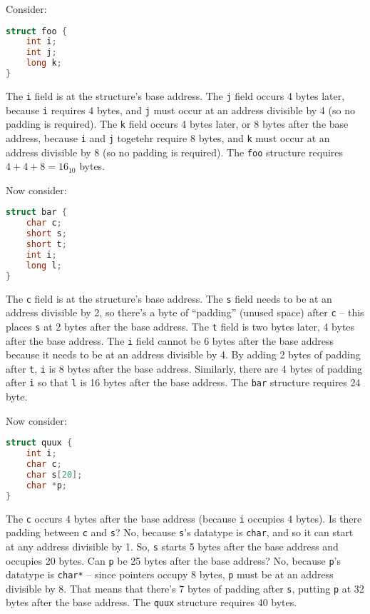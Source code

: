 \documentclass{article}
\begin{document}
Consider:

\begin{lstlisting}[language=C]
struct foo {
    int i;
    int j;
    long k;
}
\end{lstlisting}

The \lstinline{i} field is at the structure's base address.
The \lstinline{j} field occurs 4 bytes later, because \lstinline{i} requires 4 bytes, and \lstinline{j} must occur at an address divisible by 4 (so no padding is required).
The \lstinline{k} field occurs 4 bytes later, or 8 bytes after the base address, because \lstinline{i} and \lstinline{j} togetehr require 8 bytes, and \lstinline{k} must occur at an address divisible by 8 (so no padding is required).
The \lstinline{foo} structure requires $4+4+8=16_{10}$ bytes.

Now consider:

\begin{lstlisting}[language=C]
struct bar {
    char c;
    short s;
    short t;
    int i;
    long l;
}
\end{lstlisting}

The \lstinline{c} field is at the structure's base address.
The \lstinline{s} field needs to be at an address divisible by 2, so there's a byte of ``padding'' (unused space) after \lstinline{c} -- this places \lstinline{s} at 2 bytes after the base address.
The \lstinline{t} field is two bytes later, 4 bytes after the base address.
The \lstinline{i} field cannot be 6 bytes after the base address because it needs to be at an address divisible by 4.
By adding 2 bytes of padding after \lstinline{t}, \lstinline{i} is 8 bytes after the base address.
Similarly, there are 4 bytes of padding after \lstinline{i} so that \lstinline{l} is 16 bytes after the base address.
The \lstinline{bar} structure requires 24 byte.

Now consider:

\begin{lstlisting}[language=C]
struct quux {
    int i;
    char c;
    char s[20];
    char *p;
}
\end{lstlisting}

The \lstinline{c} occurs 4 bytes after the base address (because \lstinline{i} occupies 4 bytes).
Is there padding between \lstinline{c} and \lstinline{s}?
No, because \lstinline{s}'s datatype is \lstinline{char}, and so it can start at any address divisible by 1.
So, \lstinline{s} starts 5 bytes after the base address and occupies 20 bytes.
Can \lstinline{p} be 25 bytes after the base address?
No, because \lstinline{p}'s datatype is \lstinline{char*} -- since pointers occupy 8 bytes, \lstinline{p} must be at an address divisible by 8.
That means that there's 7 bytes of padding after \lstinline{s}, putting \lstinline{p} at 32 bytes after the base address.
The \lstinline{quux} structure requires 40 bytes.
\end{document}
